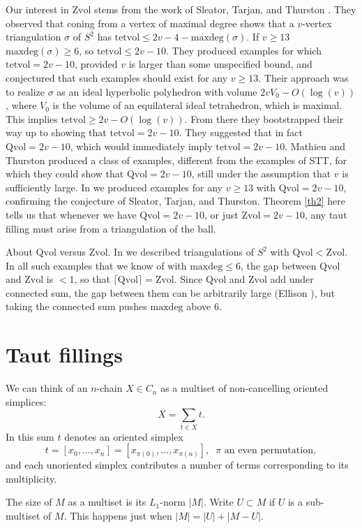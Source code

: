 \documentclass[12pt]{article}
\newcommand{\kw}{\mathrm}
\newcommand{\maxdeg}{\kw{maxdeg}}
\newcommand{\Zvol}{\kw{Zvol}}
\newcommand{\Qvol}{\kw{Qvol}}
\newcommand{\tetvol}{\kw{tetvol}}
\begin{document}
Our interest in $\Zvol$ stems from the work
of Sleator, Tarjan, and Thurston
\cite{stt:jams}.
They observed that coning from a vertex of maximal degree
shows that a $v$-vertex
triangulation $\sigma$
of $S^2$ has $\tetvol \leq 2v-4-\maxdeg(\sigma)$.
If $v\geq13$ $\maxdeg(\sigma) \geq 6$, so $\tetvol \leq 2v-10$.
They
produced examples for which $\tetvol = 2v-10$, provided
$v$ is larger than some unspecified bound,
and conjectured that such examples should exist for any $v \geq 13$.
Their approach was to 
realize $\sigma$ as an ideal hyperbolic polyhedron
with volume $2v V_0-O(\log(v))$,
where $V_0$ is the volume of an
equilateral ideal tetrahedron,
which is maximal.
This implies $\tetvol \geq 2v-O(\log(v))$.
From there they bootstrapped their way up to showing
that $\tetvol=2v-10$.
They suggested
\cite[p. 697]{stt:jams}
that in fact $\Qvol= 2v-10$,
which would immediately imply $\tetvol=2v-10$.
Mathieu and Thurston \cite{mt}
produced a class of examples,
different from the examples of STT,
for which they could show that $\Qvol = 2v-10$,
still under the assumption that $v$
is sufficiently large.
In \cite{dew:filling} we produced examples for any $v \geq 13$ with
$\Qvol=2v-10$, confirming the conjecture of Sleator, Tarjan, and Thurston.
Theorem \ref{th2} here
tells us that whenever we have $\Qvol=2v-10$,
or just $\Zvol=2v-10$, any taut filling
must arise from a triangulation of the ball.

About $\Qvol$ versus $\Zvol$.
In \cite{dew:filling}
we described triangulations of $S^2$ with $\Qvol < \Zvol$.
In all such examples that we know of
with $\maxdeg \leq 6$, the gap between $\Qvol$ and $\Zvol$ is $<1$,
so that
$\lceil \Qvol \rceil = \Zvol$.
Since $\Qvol$ and $\Zvol$
add under connected sum,
the gap between them can be arbitrarily
large
(Ellison \cite{ellison:gap}),
but taking the connected sum pushes $\maxdeg$ above $6$.



\section{Taut fillings}

We can think of an $n$-chain $X \in C_n$ as a multiset of
non-cancelling oriented simplices:
\[
X = \sum_{t \in X} t
.
\]
In this sum $t$ denotes an oriented simplex
\[
t=[x_0,\ldots,x_n]
= [x_{\pi(0)},\ldots,x_{\pi(n)}]
,\;\;\mbox{$\pi$ an even permutation}
,
\]
and each unoriented simplex contributes a number of terms corresponding
to its multiplicity.

The size of $M$ as a multiset is its $L_1$-norm $|M|$.
Write $U \subset M$
if $U$ is a sub-multiset of $M$.
This happens just when
$|M| = |U| + |M-U|$.
\end{document}
